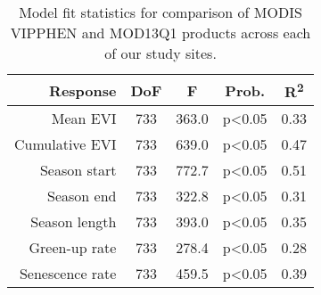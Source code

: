 \begin{table}[h]
\centering
\begin{tabular}{rcccc}
  \hline
Response & DoF & F & Prob. & R\textsuperscript{2} \\ 
  \hline
Mean EVI & 733 & 363.0 & p<0.05 & 0.33 \\ 
  Cumulative EVI & 733 & 639.0 & p<0.05 & 0.47 \\ 
  Season start & 733 & 772.7 & p<0.05 & 0.51 \\ 
  Season end & 733 & 322.8 & p<0.05 & 0.31 \\ 
  Season length & 733 & 393.0 & p<0.05 & 0.35 \\ 
  Green-up rate & 733 & 278.4 & p<0.05 & 0.28 \\ 
  Senescence rate & 733 & 459.5 & p<0.05 & 0.39 \\ 
   \hline
\end{tabular}
\caption{Model fit statistics for comparison of MODIS VIPPHEN and MOD13Q1 products across each of our study sites.} 
\label{annot_df}
\end{table}


